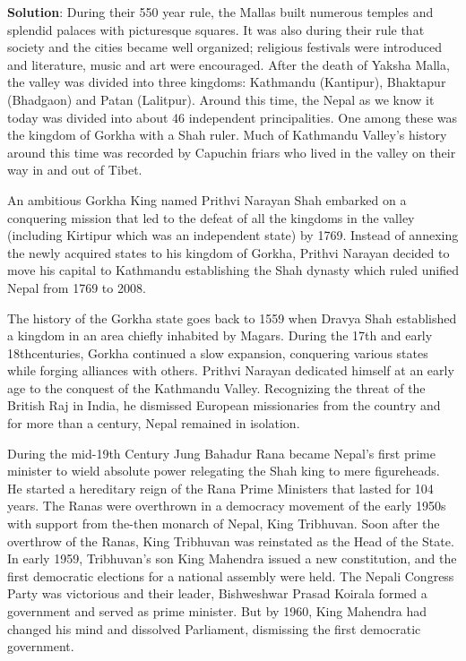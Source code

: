 \documentclass[
]{book}
\newenvironment{solution}{ {\bfseries Solution}:}{}
\begin{document}
\begin{questions}
\begin{solution}
During their 550 year rule, the Mallas built numerous temples and splendid palaces with picturesque squares. It was also during their rule that society and the cities became well organized; religious festivals were introduced and literature, music and art were encouraged. After the death of Yaksha Malla, the valley was divided into three kingdoms: Kathmandu (Kantipur), Bhaktapur (Bhadgaon) and Patan (Lalitpur). Around this time, the Nepal as we know it today was divided into about 46 independent principalities. One among these was the kingdom of Gorkha with a Shah ruler. Much of Kathmandu Valley’s history around this time was recorded by Capuchin friars who lived in the valley on their way in and out of Tibet.

An ambitious Gorkha King named Prithvi Narayan Shah embarked on a conquering mission that led to the defeat of all the kingdoms in the valley (including Kirtipur which was an independent state) by 1769. Instead of annexing the newly acquired states to his kingdom of Gorkha, Prithvi Narayan decided to move his capital to Kathmandu establishing the Shah dynasty which ruled unified Nepal from 1769 to 2008.

The history of the Gorkha state goes back to 1559 when Dravya Shah established a kingdom in an area chiefly inhabited by Magars. During the 17th and early 18thcenturies, Gorkha continued a slow expansion, conquering various states while forging alliances with others. Prithvi Narayan dedicated himself at an early age to the conquest of the Kathmandu Valley. Recognizing the threat of the British Raj in India, he dismissed European missionaries from the country and for more than a century, Nepal remained in isolation.

During the mid-19th Century Jung Bahadur Rana became Nepal’s first prime minister to wield absolute power relegating the Shah king to mere figureheads. He started a hereditary reign of the Rana Prime Ministers that lasted for 104 years. The Ranas were overthrown in a democracy movement of the early 1950s with support from the-then monarch of Nepal, King Tribhuvan. Soon after the overthrow of the Ranas, King Tribhuvan was reinstated as the Head of the State. In early 1959, Tribhuvan’s son King Mahendra issued a new constitution, and the first democratic elections for a national assembly were held. The Nepali Congress Party was victorious and their leader, Bishweshwar Prasad Koirala formed a government and served as prime minister. But by 1960, King Mahendra had changed his mind and dissolved Parliament, dismissing the first democratic government.


\end{solution}
\end{questions}
\end{document}
